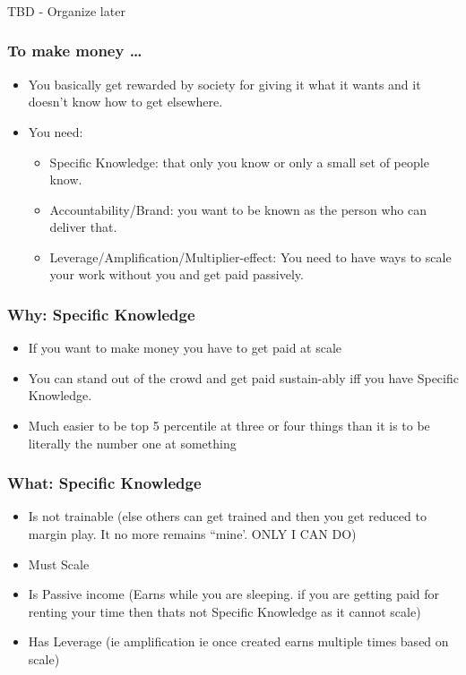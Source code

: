 \begin{frame}[fragile]\frametitle{}
\begin{center}
{\Large TBD - Organize later}

\end{center}
\end{frame}

\begin{frame}[fragile]
\frametitle{To make money \ldots}
\begin{itemize}
\item You basically get rewarded by society for giving it what it wants and it doesn’t know how to get elsewhere.
\item You need:
\begin{itemize}
\item Specific Knowledge: that only you know or only a small set of people know.
\item Accountability/Brand: you want to be known as the person who can deliver that.
\item Leverage/Amplification/Multiplier-effect: You need to have ways to scale your work without you and get paid passively.
\end{itemize}
\end{itemize}
\end{frame}

\begin{frame}[fragile]
\frametitle{Why: Specific Knowledge}
\begin{itemize}
\item If you want to make money you have to get paid at scale
\item You can stand out of the crowd and get paid sustain-ably iff you have Specific Knowledge.
\item  Much easier to be top 5 percentile at three or four things than it is to be literally the number one at something
\end{itemize}
\end{frame}

\begin{frame}[fragile]
\frametitle{What: Specific Knowledge}
\begin{itemize}
\item Is not trainable (else others can get trained and then you get reduced to margin play. It no more remains ``mine'. ONLY I CAN DO)
\item Must Scale
\item Is Passive income (Earns while you are sleeping. if you are getting paid for renting your time then thats not Specific Knowledge as it cannot scale)
\item Has Leverage (ie amplification ie once created earns multiple times based on scale)
\end{itemize}
\end{frame}


